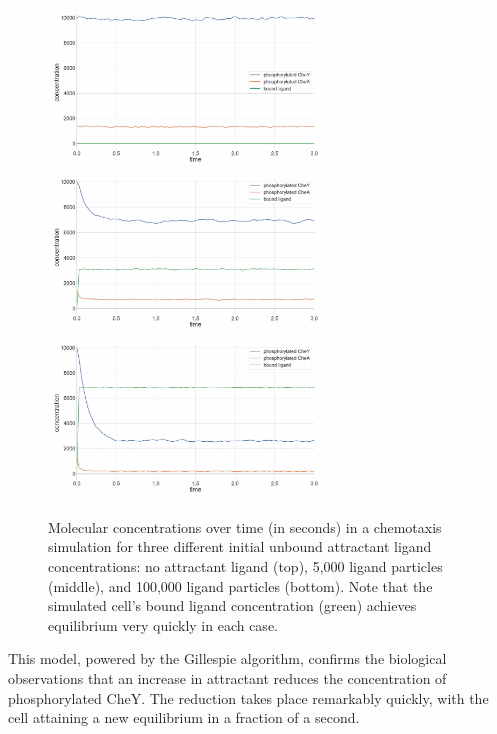 \begin{figure}[hp]
\centering
\mySfFamily
\includegraphics[width = 0.65\textwidth]{../images_CMYK/chemotaxis_tutorial5_vscode}\\[1ex]
\includegraphics[width = 0.65\textwidth]{../images_CMYK/chemotaxis_tutorial6_vscode}\\[1ex]
\includegraphics[width = 0.65\textwidth]{../images_CMYK/chemotaxis_tutorial7_vscode}
\caption{Molecular concentrations over time (in seconds) in a chemotaxis simulation for three different initial unbound attractant ligand concentrations: no attractant ligand (top), 5,000 ligand particles (middle), and 100,000 ligand particles (bottom). Note that the simulated cell's bound ligand concentration (green) achieves equilibrium very quickly in each case.}
\label{fig:chemotaxis_concentrations}
\end{figure}

This model, powered by the Gillespie algorithm, confirms the biological observations that an increase in attractant reduces the concentration of phosphorylated CheY. The reduction takes place remarkably quickly, with the cell attaining a new equilibrium in a fraction of a second.

